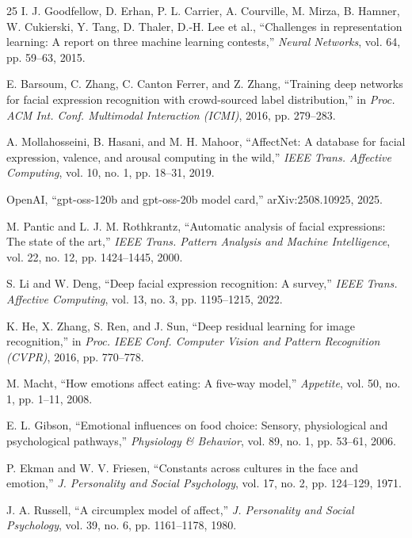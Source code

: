 \documentclass[conference]{IEEEtran}
\begin{document}
\begin{thebibliography}{25}
I. J. Goodfellow, D. Erhan, P. L. Carrier, A. Courville, M. Mirza, B. Hamner, W. Cukierski, Y. Tang, D. Thaler, D.-H. Lee et al., ``Challenges in representation learning: A report on three machine learning contests,'' \emph{Neural Networks}, vol. 64, pp. 59--63, 2015.

E. Barsoum, C. Zhang, C. Canton Ferrer, and Z. Zhang, ``Training deep networks for facial expression recognition with crowd-sourced label distribution,'' in \emph{Proc. ACM Int. Conf. Multimodal Interaction (ICMI)}, 2016, pp. 279--283.

A. Mollahosseini, B. Hasani, and M. H. Mahoor, ``AffectNet: A database for facial expression, valence, and arousal computing in the wild,'' \emph{IEEE Trans. Affective Computing}, vol. 10, no. 1, pp. 18--31, 2019.

OpenAI, ``gpt-oss-120b and gpt-oss-20b model card,'' arXiv:2508.10925, 2025.

M. Pantic and L. J. M. Rothkrantz, ``Automatic analysis of facial expressions: The state of the art,'' \emph{IEEE Trans. Pattern Analysis and Machine Intelligence}, vol. 22, no. 12, pp. 1424--1445, 2000.

S. Li and W. Deng, ``Deep facial expression recognition: A survey,'' \emph{IEEE Trans. Affective Computing}, vol. 13, no. 3, pp. 1195--1215, 2022.

K. He, X. Zhang, S. Ren, and J. Sun, ``Deep residual learning for image recognition,'' in \emph{Proc. IEEE Conf. Computer Vision and Pattern Recognition (CVPR)}, 2016, pp. 770--778.

M. Macht, ``How emotions affect eating: A five-way model,'' \emph{Appetite}, vol. 50, no. 1, pp. 1--11, 2008.

E. L. Gibson, ``Emotional influences on food choice: Sensory, physiological and psychological pathways,'' \emph{Physiology \& Behavior}, vol. 89, no. 1, pp. 53--61, 2006.

P. Ekman and W. V. Friesen, ``Constants across cultures in the face and emotion,'' \emph{J. Personality and Social Psychology}, vol. 17, no. 2, pp. 124--129, 1971.

J. A. Russell, ``A circumplex model of affect,'' \emph{J. Personality and Social Psychology}, vol. 39, no. 6, pp. 1161--1178, 1980.


\end{thebibliography}
\end{document}
